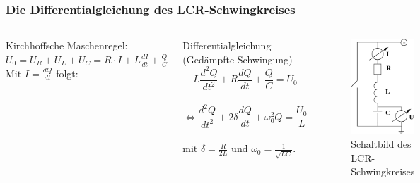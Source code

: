 \documentclass{beamer}
\begin{document}
\begin{frame}
\frametitle{Die Differentialgleichung des LCR-Schwingkreises}

\begin{columns}[c]

Kirchhoffsche Maschenregel: $U_0 = U_R + U_L + U_C = R\cdot I + L\frac{dI}{dt} + \frac{Q}{C}$ \\
Mit $I = \frac{dQ}{dt}$ folgt:
\begin{block}{Differentialgleichung (Gedämpfte Schwingung)}
$$L\frac{d^2Q}{dt^2} + R \frac{dQ}{dt} + \frac{Q}{C} = U_0$$ \\
$$\Leftrightarrow \frac{d^2Q}{dt^2} + 2\delta \frac{dQ}{dt} + \omega_0^2Q = \frac{U_0}{L}$$ \\
mit $\delta = \frac{R}{2L}$ und $\omega_0 = \frac{1}{\sqrt{LC}}$.
\end{block}

\begin{figure}
\includegraphics[width = \textwidth]{abbildungen/lcr_schaltbild.png}
\caption{Schaltbild des LCR-Schwingkreises}
\end{figure}
\end{columns}

\end{frame}
\end{document}
